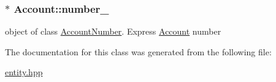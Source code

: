 \subsubsection[{\texorpdfstring{number\+\_\+}{number_}}]{$\ast$ Account\+::number\+\_\+\hspace{0.3cm}{\ttfamily [private]}}\hypertarget{classAccount_ac9b3b21656d266b933d6fda9f2ec68f8}{}\label{classAccount_ac9b3b21656d266b933d6fda9f2ec68f8}
object of class \hyperlink{classAccountNumber}{Account\+Number}. Express \hyperlink{classAccount}{Account} number 

The documentation for this class was generated from the following file\+:\begin{DoxyCompactItemize}
\item 
\hyperlink{entity_8hpp}{entity.\+hpp}\end{DoxyCompactItemize}
